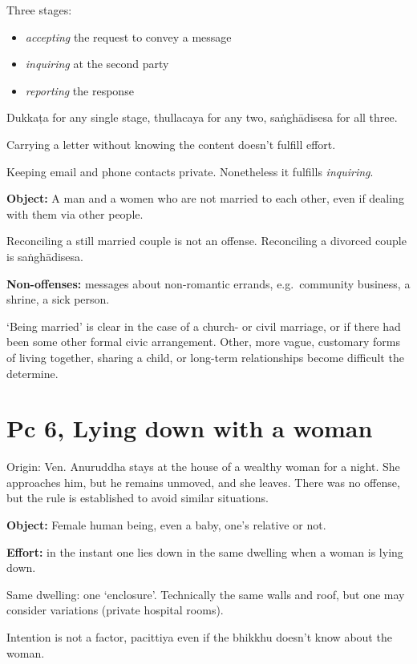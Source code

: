 Three stages:

\begin{itemize}
\tightlist
\item
  \emph{accepting} the request to convey a message
\item
  \emph{inquiring} at the second party
\item
  \emph{reporting} the response
\end{itemize}

Dukkaṭa for any single stage, thullacaya for any two, saṅghādisesa for
all three.

Carrying a letter without knowing the content doesn't fulfill effort.

Keeping email and phone contacts private. Nonetheless it fulfills
\emph{inquiring}.

\textbf{Object:} A man and a women who are not married to each other,
even if dealing with them via other people.

Reconciling a still married couple is not an offense. Reconciling a
divorced couple is saṅghādisesa.

\enlargethispage{2\baselineskip}

\textbf{Non-offenses:} messages about non-romantic errands,
e.g.~community business, a shrine, a sick person.

`Being married' is clear in the case of a church- or civil marriage, or
if there had been some other formal civic arrangement. Other, more
vague, customary forms of living together, sharing a child, or long-term
relationships become difficult the determine.

\section{Pc 6, Lying down with a woman}

Origin: Ven. Anuruddha stays at the house of a wealthy woman for a
night. She approaches him, but he remains unmoved, and she leaves. There
was no offense, but the rule is established to avoid similar situations.

\textbf{Object:} Female human being, even a baby, one's relative or not.

\textbf{Effort:} in the instant one lies down in the same dwelling when
a woman is lying down.

Same dwelling: one `enclosure'. Technically the same walls and roof, but
one may consider variations (private hospital rooms).

Intention is not a factor, pacittiya even if the bhikkhu doesn't know
about the woman.

